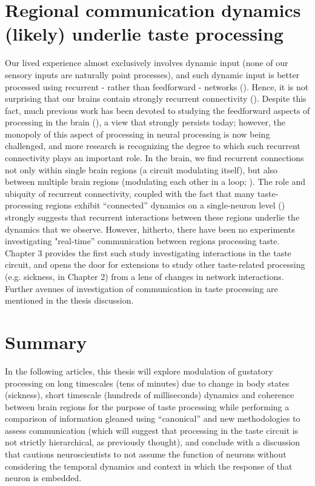 \begin{refsection}
\section{Regional communication dynamics (likely) underlie taste processing}
Our lived experience almost exclusively involves dynamic input (none of our sensory inputs are naturally point processes), and such dynamic input is better processed using recurrent - rather than feedforward - networks (\cite{kietzmann2019a,alamia2020a}). Hence, it is not surprising that our brains contain strongly recurrent connectivity (\cite{rigotti2010a,bergen2020a,matsumoto2022a}). 
Despite this fact, much previous work has been devoted to studying the feedforward aspects of processing in the brain (\cite{carleton2010a,heidari-gorji2021a}), a view that strongly persists today; however, the monopoly of this aspect of processing in neural processing is now being challenged, and more research is recognizing the degree to which such recurrent connectivity plays an important role. In the brain, we find recurrent connections not only within single brain regions (a circuit modulating itself), but also between multiple brain regions (modulating each other in a loop; \cite{mante2013a,hart2020a,kotekal2020a}).
The role and ubiquity of recurrent connectivity, coupled with the fact that many taste-processing regions exhibit “connected” dynamics on a single-neuron level (\cite{grossman2008a,fontanini2009a,jezzini2013a,li2013a,baez-santiago2016a}) strongly suggests that recurrent interactions between these regions underlie the dynamics that we observe. However, hitherto, there have been no experiments investigating "real-time” communication between regions processing taste. Chapter 3 provides the first such study investigating interactions in the taste circuit, and opens the door for extensions to study other taste-related processing (e.g. sickness, in Chapter 2) from a lens of changes in network interactions. Further avenues of investigation of communication in taste processing are mentioned in the thesis discussion.

\section{Summary}
In the following articles, this thesis will explore modulation of gustatory processing on long timescales (tens of minutes) due to change in body states (sickness), short timescale (hundreds of milliseconds) dynamics and coherence between brain regions for the purpose of taste processing while performing a comparison of information gleaned using “canonical” and new methodologies to assess communication (which will suggest that processing in the taste circuit is not strictly hierarchical, as previously thought), and conclude with a discussion that cautions neuroscientists to not assume the function of neurons without considering the temporal dynamics and context in which the response of that neuron is embedded.

\printbibliography[title={References}]
\end{refsection}